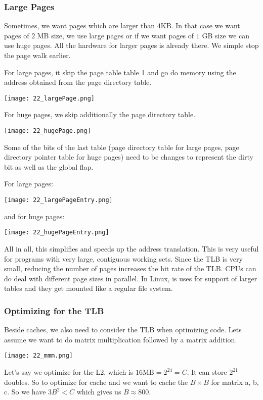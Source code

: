 

\subsubsection{Large Pages}
Sometimes, we want pages which are larger than $4$KB. In that case we want pages of $2$ MB size, we use large pages or if we want pages of $1$ GB size we can use huge pages. All the hardware for larger pages is already there. We simple stop the page walk earlier.

For large pages, it skip the page table table 1 and go do memory using the address obtained from the page directory table.

\texttt{[image: 22\_largePage.png]}

For huge pages, we skip additionally the page directory table.

\texttt{[image: 22\_hugePage.png]}

Some of the bits of the last table (page directory table for large pages, page directory pointer table for huge pages) need to be changes to represent the dirty bit as well as the global flap.

For large pages:

\texttt{[image: 22\_largePageEntry.png]}

and for huge pages:

\texttt{[image: 22\_hugePageEntry.png]}

All in all, this simplifies and speeds up the address translation. This is very useful for programs with very large, contiguous working sets. Since the TLB is very small, reducing the number of pages increases the hit rate of the TLB. CPUs can do deal with different page sizes in parallel. In Linux,  is uses for support of larger tables and they get mounted like a regular file system.

\subsubsection{Optimizing for the TLB}
Beside caches, we also need to consider the TLB when optimizing code. Lets assume we want to do matrix multiplication followed by a matrix addition.

\texttt{[image: 22\_mmm.png]}

Let's say we optimize for the L2, which is $16 \text{MB} = 2^{24} = C$. It can store $2^{21}$ doubles. So to optimize for cache and we want to cache the $B \times B$ for matrix a, b, c. So we have $3B^2 < C$ which gives us $B \approx 800$.

